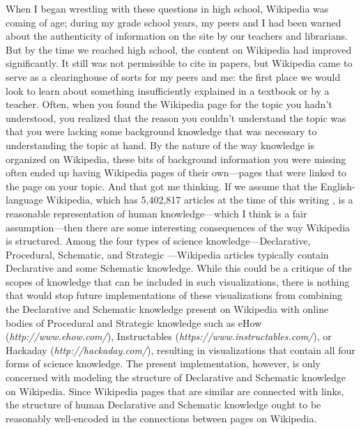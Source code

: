 \documentclass[man, 12pt, floatsintext, donotrepeattitle]{apa6}
\begin{document}
When I began wrestling with these questions in high school, Wikipedia was coming
of age; during my grade school years, my peers and I had been warned about the
authenticity of information on the site by our teachers and librarians.  But by
the time we reached high school, the content on Wikipedia had improved
significantly.  It still was not permissible to cite in papers, but Wikipedia
came to serve as a clearinghouse of sorts for my peers and me: the first place
we would look to learn about something insufficiently explained in a textbook
or by a teacher.  Often, when you found the Wikipedia page for the topic you
hadn't understood, you realized that the reason you couldn't understand the
topic was that you were lacking some background knowledge that was necessary to
understanding the topic at hand.  By the nature of the way knowledge is
organized on Wikipedia, these bits of background information you were missing
often ended up having Wikipedia pages of their own---pages that were linked to
the page on your topic.  And that got me thinking.
If we assume that the English-language Wikipedia, which has 5,402,817 articles
at the time of this writing \parencite{WikimediaFoundation2017a},
is a reasonable representation of human
knowledge---which I think is a fair assumption---then there are some interesting
consequences of the way Wikipedia is structured.  Among the four types of
science knowledge---Declarative, Procedural, Schematic, and Strategic
\parencite{Li2006}---Wikipedia articles typically contain Declarative and some
Schematic knowledge.  While this could be a critique of the scopes of knowledge
that can be included in such visualizations, there is nothing that would stop
future implementations of these visualizations from combining the Declarative
and Schematic knowledge present on Wikipedia with online bodies of
Procedural and Strategic knowledge such as eHow (\emph{http://www.ehow.com/}),
Instructables (\emph{https://www.instructables.com/}), or Hackaday
(\emph{http://hackaday.com/}), resulting in visualizations that contain all
four forms of science knowledge.  The present implementation, however, is only
concerned with modeling the structure of Declarative and Schematic knowledge on
Wikipedia. Since Wikipedia pages that are similar
are connected with links, the structure of human Declarative and Schematic
knowledge ought to be
reasonably well-encoded in the connections between pages on Wikipedia.
\end{document}
